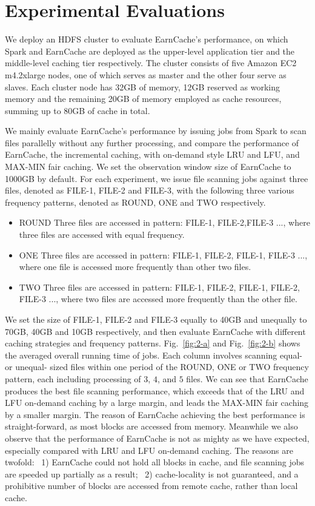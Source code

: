 \section{Experimental Evaluations}\label{sec:Experiments}

We deploy an HDFS cluster to evaluate EarnCache's performance, on which Spark and EarnCache are deployed as the upper-level application tier and the middle-level caching tier respectively.
The cluster consists of five Amazon EC2 m4.2xlarge nodes, one of which serves as master and the other four serve as slaves.
Each cluster node has 32GB of memory, 12GB reserved as working memory and the remaining 20GB of memory employed as cache resources, summing up to 80GB of cache in total.

We mainly evaluate EarnCache's performance by issuing jobs from Spark to scan files parallelly without any further processing, and compare the performance of EarnCache, the incremental caching, with on-demand style LRU and LFU, and MAX-MIN fair caching.
We set the observation window size of EarnCache to 1000GB by default. For each experiment, we issue file scanning jobs against three files, denoted as FILE-1, FILE-2 and FILE-3, with the following three various frequency patterns, denoted as ROUND, ONE and TWO respectively.
\begin{itemize}
\item ROUND Three files are accessed in pattern: FILE-1, FILE-2,FILE-3 ..., where three files are accessed with equal frequency.
\item ONE Three files are accessed in pattern: FILE-1, FILE-2, FILE-1, FILE-3 ..., where one file is accessed more frequently than other two files.
\item TWO Three files are accessed in pattern: FILE-1, FILE-2, FILE-1, FILE-2, FILE-3 ..., where two files are accessed more frequently than the other file.
\end{itemize}

We set the size of FILE-1, FILE-2 and FILE-3 equally to 40GB and unequally to 70GB, 40GB and 10GB respectively, and then evaluate EarnCache with different caching strategies and frequency patterns. Fig.~\ref{fig:2-a} and Fig.~\ref{fig:2-b} shows the averaged overall running time of jobs. Each column involves scanning equal- or unequal- sized files within one period of the ROUND, ONE or TWO frequency pattern, each including processing of $3$, $4$, and $5$ files. 
We can see that EarnCache produces the best file scanning performance, which exceeds that of the LRU and LFU on-demand caching by a large margin, and leads the MAX-MIN fair caching by a smaller margin. 
The reason of EarnCache achieving the best performance is straight-forward, as most blocks are accessed from memory.
Meanwhile we also observe that the performance of EarnCache is not as mighty as we have expected, especially compared with LRU and LFU on-demand caching.
The reasons are twofold: ~1) EarnCache could not hold all blocks in cache, and file scanning jobs are speeded up partially as a result; ~2) cache-locality is not guaranteed, and a prohibitive number of blocks are accessed from remote cache, rather than local cache.

